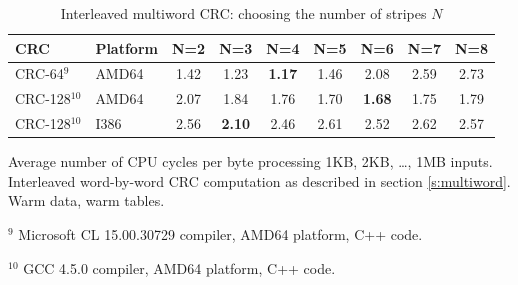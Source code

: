 \documentclass{article}
\begin{document}
\begin{table}
\begin{center}
\caption{Interleaved multiword CRC: choosing the number of stripes $N$}

\label{t:MultiwordPerfByStripe}
\begin{tabular}{| l | l | c | c | c | c | c | c | c |}
  \hline
    CRC             & Platform & N=2   & N=3   & N=4   & N=5   & N=6   & N=7   & N=8      \\
  \hline
            CRC-64$^9$ & AMD64 &  1.42 &  1.23 &  {\bf 1.17} &  1.46 &  2.08 &  2.59 &  2.73    \\
        CRC-128$^{10}$ & AMD64 &  2.07 &  1.84 &  1.76 &  1.70 &  {\bf 1.68} &  1.75 &  1.79    \\
        CRC-128$^{10}$ &  I386 &  2.56 &  {\bf 2.10} &  2.46 &  2.61 &  2.52 &  2.62 &  2.57    \\
  \hline
\end{tabular}
\end{center}
{}

Average number of CPU cycles per byte processing 1KB, 2KB, \ldots, 1MB
inputs. Interleaved word-by-word CRC computation as described in section
\ref{s:multiword}. Warm data, warm tables.

$^9$ Microsoft CL 15.00.30729 compiler, AMD64 platform, C++ code.

$^{10}$ GCC 4.5.0 compiler, AMD64 platform, C++ code.

\end{table}
\end{document}
